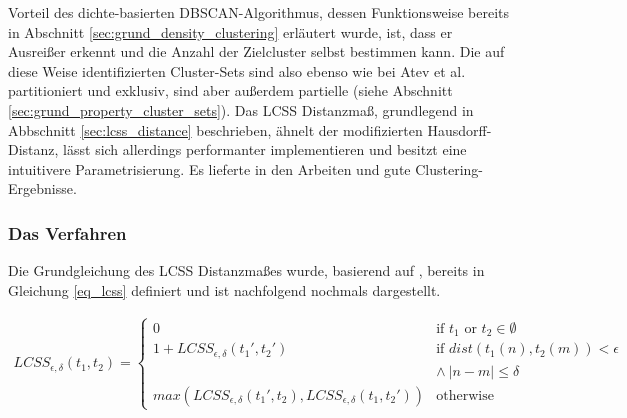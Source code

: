 Vorteil des dichte-basierten DBSCAN-Algorithmus, dessen Funktionsweise bereits in Abschnitt
\ref{sec:grund_density_clustering} erläutert wurde, ist, dass er Ausreißer erkennt und die Anzahl der
Zielcluster selbst bestimmen kann.
Die auf diese Weise identifizierten Cluster-Sets sind also ebenso wie bei Atev et al. partitioniert und exklusiv,
sind aber außerdem partielle (siehe Abschnitt \ref{sec:grund_property_cluster_sets}).
Das LCSS Distanzmaß, grundlegend in Abbschnitt \ref{sec:lcss_distance}
beschrieben, ähnelt der modifizierten Hausdorff-Distanz, lässt sich allerdings performanter implementieren
und besitzt eine intuitivere Parametrisierung. Es lieferte in den Arbeiten \cite[]{Morris2011} und
\cite[]{Chen2014} gute Clustering-Ergebnisse.

\subsubsection{Das Verfahren}

Die Grundgleichung des LCSS Distanzmaßes wurde, basierend auf \cite[]{Vlachos2002}, bereits in Gleichung
\ref{eq_lcss} definiert und ist nachfolgend nochmals dargestellt.

\begin{ceqn}
\begin{align*}
    LCSS_{\epsilon, \delta}(t_1, t_2) =
    \begin{cases}
        0 & \text{if } t_1 \text{ or } t_2 \in \emptyset \\
        1 + LCSS_{\epsilon, \delta}(t_1', t_2') & \text{if } dist(t_1(n), t_2(m)) < \epsilon \\
        & \land\ |n - m| \leq \delta \\
        max(LCSS_{\epsilon, \delta}(t_1', t_2), LCSS_{\epsilon, \delta}(t_1, t_2')) & \text{otherwise}
    \end{cases}
\end{align*}
\end{ceqn}

